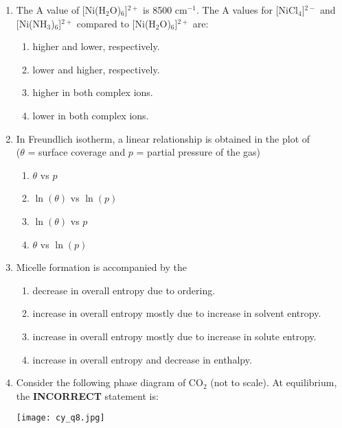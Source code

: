 \documentclass[12pt]{article}
\begin{document}
\begin{enumerate}[label=Q.\arabic*]
\item The A value of [Ni(H$_2$O)$_6$]$^{2+}$ is 8500 cm$^{-1}$. The A values for [NiCl$_4$]$^{2-}$ and [Ni(NH$_3$)$_6$]$^{2+}$ compared to [Ni(H$_2$O)$_6$]$^{2+}$ are:

\begin{enumerate}[label=(\Alph*)]
\item higher and lower, respectively.
\item lower and higher, respectively.
\item higher in both complex ions.
\item lower in both complex ions.
\end{enumerate}
\item In Freundlich isotherm, a linear relationship is obtained in the plot of \\
		($\theta$ = surface coverage and $p$ = partial pressure of the gas)

		\begin{enumerate}[label=(\Alph*)]
		\item $\theta$ vs $p$
		\item $\ln(\theta)$ vs $\ln(p)$
		\item $\ln(\theta)$ vs $p$
		\item $\theta$ vs $\ln(p)$
		\end{enumerate}

		\item Micelle formation is accompanied by the

		\begin{enumerate}[label=(\Alph*)]
		\item decrease in overall entropy due to ordering.
		\item increase in overall entropy mostly due to increase in solvent entropy.
		\item increase in overall entropy mostly due to increase in solute entropy.
		\item increase in overall entropy and decrease in enthalpy.
		\end{enumerate}

		\item Consider the following phase diagram of CO$_2$ (not to scale). At equilibrium, the \textbf{INCORRECT} statement is:

		\begin{center}
		\texttt{[image: cy\_q8.jpg]}
		\end{center}


\end{enumerate}
\end{document}
